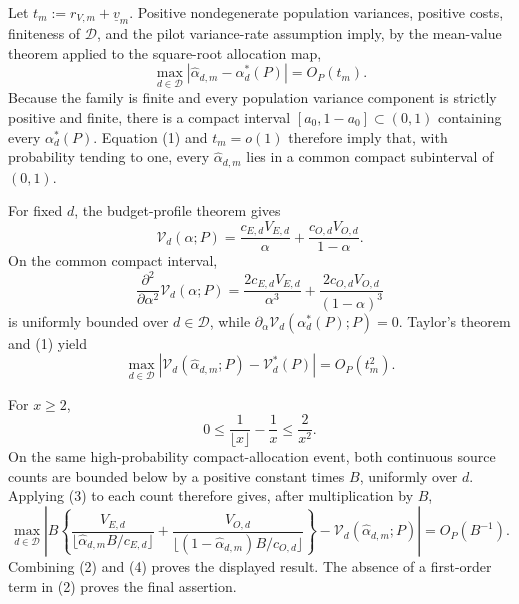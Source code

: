 Let \(t_m:=r_{V,m}+\underline v_m\).  Positive nondegenerate population variances, positive costs, finiteness of \(\mathcal D\), and the pilot variance-rate assumption imply, by the mean-value theorem applied to the square-root allocation map,
\[
 \max_{d\in\mathcal D}
 |\widehat\alpha_{d,m}-\alpha_d^*(P)|=O_P(t_m).                              \tag{1}
\]
Because the family is finite and every population variance component is strictly positive and finite, there is a compact interval \([a_0,1-a_0]\subset(0,1)\) containing every \(\alpha_d^*(P)\).  Equation (1) and \(t_m=o(1)\) therefore imply that, with probability tending to one, every \(\widehat\alpha_{d,m}\) lies in a common compact subinterval of \((0,1)\).

For fixed \(d\), the budget-profile theorem gives
\[
 \mathcal V_d(\alpha;P)
 =\frac{c_{E,d}V_{E,d}}{\alpha}
  +\frac{c_{O,d}V_{O,d}}{1-\alpha}.
\]
On the common compact interval,
\[
 \frac{\partial^2}{\partial\alpha^2}\mathcal V_d(\alpha;P)
 =\frac{2c_{E,d}V_{E,d}}{\alpha^3}
  +\frac{2c_{O,d}V_{O,d}}{(1-\alpha)^3}
\]
is uniformly bounded over \(d\in\mathcal D\), while
\(\partial_\alpha\mathcal V_d(\alpha_d^*(P);P)=0\).  Taylor's theorem and (1) yield
\[
 \max_{d\in\mathcal D}
 \left|\mathcal V_d(\widehat\alpha_{d,m};P)-\mathcal V_d^*(P)\right|
 =O_P(t_m^2).                                                               \tag{2}
\]

For \(x\ge2\),
\[
 0\le \frac1{\lfloor x\rfloor}-\frac1x\le\frac2{x^2}.                    \tag{3}
\]
On the same high-probability compact-allocation event, both continuous source counts are bounded below by a positive constant times \(B\), uniformly over \(d\).  Applying (3) to each count therefore gives, after multiplication by \(B\),
\[
 \max_{d\in\mathcal D}\left|
 B\left\{
 \frac{V_{E,d}}{\lfloor\widehat\alpha_{d,m}B/c_{E,d}\rfloor}
 +\frac{V_{O,d}}{\lfloor(1-\widehat\alpha_{d,m})B/c_{O,d}\rfloor}
 \right\}
 -\mathcal V_d(\widehat\alpha_{d,m};P)
 \right|=O_P(B^{-1}).                                                       \tag{4}
\]
Combining (2) and (4) proves the displayed result.  The absence of a first-order term in (2) proves the final assertion.